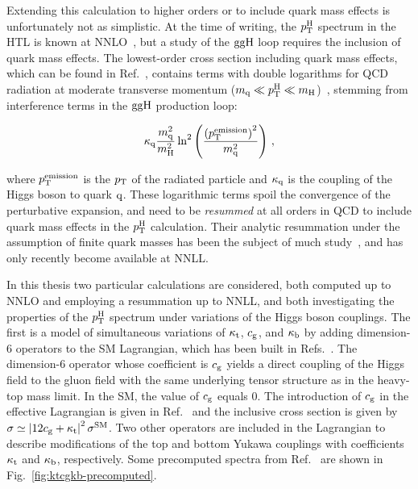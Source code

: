 % 
Extending this calculation to higher orders or to include quark mass effects is unfortunately not as simplistic.
% 
At the time of writing, the $p_\mathrm{T}^\mathrm{H}$ spectrum in the HTL is known at NNLO~\cite{Boughezal:2015dra,Boughezal:2015aha,Chen:2016zka}, but a study of the $\mathrm{g}\mathrm{g}\mathrm{H}$ loop requires the inclusion of quark mass effects.
% 
The lowest-order cross section including quark mass effects, which can be found in Ref.~\cite{Ellis:1987xu}, contains terms with double logarithms for QCD radiation at moderate transverse momentum ($m_{\mathrm{q}} \ll p_\mathrm{T}^\mathrm{H} \ll m_{\mathrm{H}}$)~\cite{Baur:1989cm,Bishara:2016jga}, stemming from interference terms in the $\mathrm{g}\mathrm{g}\mathrm{H}$ production loop:
% 
\begin{linenomath*}
\begin{equation}
\kappa_{\mathrm{q}} \frac{m_{\mathrm{q}}^2}{m_{\mathrm{H}}^2}
    \ln^2 \left(
        \frac{
            \left( p_\mathrm{T}^\text{emission} \right)^2
            }{
            m_\mathrm{q}^2
            }
        \right)
\,,
\end{equation}
\end{linenomath*}
% 
where $p_\mathrm{T}^\text{emission}$ is the $p_\mathrm{T}$ of the radiated particle and $\kappa_{\mathrm{q}}$ is the coupling of the Higgs boson to quark $\mathrm{q}$.
% 
These logarithmic terms spoil the convergence of the perturbative expansion, and need to be \textit{resummed} at all orders in QCD to include quark mass effects in the $p_\mathrm{T}^\mathrm{H}$ calculation.
% 
Their analytic resummation under the assumption of finite quark masses has been the subject of much study~\cite{Bozzi:2003jy,Becher:2010tm,Mantler:2012bj,Grazzini:2013mca,Monni:2016ktx}, and has only recently become available at NNLL.


In this thesis two particular calculations are considered, both computed up to NNLO and employing a resummation up to NNLL, and both investigating the properties of the $p_\mathrm{T}^\mathrm{H}$ spectrum under variations of the Higgs boson couplings.
% 
The first is a model of simultaneous variations of $\kappa_{\mathrm{t}}$, $c_\mathrm{g}$, and $\kappa_{\mathrm{b}}$ by adding dimension-6 operators to the SM Lagrangian, which has been built in Refs.~\cite{Grazzini:2017szg,Grazzini:2016paz}.
% 
The dimension-6 operator whose coefficient is $c_\mathrm{g}$ yields a direct coupling of the Higgs field to the gluon field with the same underlying tensor structure as in the heavy-top mass limit.
% 
In the SM, the value of $c_\mathrm{g}$ equals 0.
% 
The introduction of $c_\mathrm{g}$ in the effective Lagrangian is given in Ref.~\cite{Grazzini:2016paz} and the inclusive cross section is given by $\sigma \simeq \left| 12c_\mathrm{g} + \kappa_{\mathrm{t}} \right|^2 \sigma^\text{SM}$.
% 
Two other operators are included in the Lagrangian to describe modifications of the top and bottom Yukawa couplings with coefficients $\kappa_{\mathrm{t}}$ and $\kappa_{\mathrm{b}}$, respectively.
% 
% 
Some precomputed spectra from Ref.~\cite{Grazzini:2017szg} are shown in Fig.~\ref{fig:ktcgkb-precomputed}.


